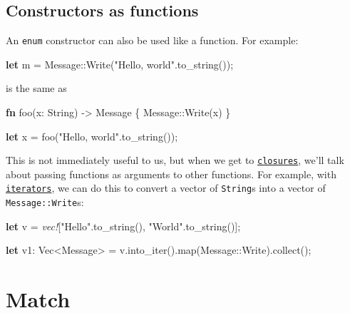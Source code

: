 \documentclass[a4paper,]{book}
\newenvironment{Shaded}{\begin{snugshade}}{\end{snugshade}}
\newcommand{\KeywordTok}[1]{\textcolor[rgb]{0.13,0.29,0.53}{\textbf{{#1}}}}
\newcommand{\DataTypeTok}[1]{\textcolor[rgb]{0.13,0.29,0.53}{{#1}}}
\newcommand{\StringTok}[1]{\textcolor[rgb]{0.31,0.60,0.02}{{#1}}}
\newcommand{\PreprocessorTok}[1]{\textcolor[rgb]{0.56,0.35,0.01}{\textit{{#1}}}}
\newcommand{\NormalTok}[1]{{#1}}
\begin{document}
\subsection{Constructors as functions}\label{constructors-as-functions}

An \texttt{enum} constructor can also be used like a function. For
example:

\begin{Shaded}
\begin{Highlighting}[]
\KeywordTok{let} \NormalTok{m = Message::Write(}\StringTok{"Hello, world"}\NormalTok{.to_string());}
\end{Highlighting}
\end{Shaded}

is the same as

\begin{Shaded}
\begin{Highlighting}[]
\KeywordTok{fn} \NormalTok{foo(x: }\DataTypeTok{String}\NormalTok{) -> Message \{}
    \NormalTok{Message::Write(x)}
\NormalTok{\}}

\KeywordTok{let} \NormalTok{x = foo(}\StringTok{"Hello, world"}\NormalTok{.to_string());}
\end{Highlighting}
\end{Shaded}

This is not immediately useful to us, but when we get to
\protect\hyperlink{sec--closures}{\texttt{closures}}, we'll talk about
passing functions as arguments to other functions. For example, with
\protect\hyperlink{sec--iterators}{\texttt{iterators}}, we can do this
to convert a vector of \texttt{String}s into a vector of
\texttt{Message::Write}s:

\begin{Shaded}
\begin{Highlighting}[]

\KeywordTok{let} \NormalTok{v = }\PreprocessorTok{vec!}\NormalTok{[}\StringTok{"Hello"}\NormalTok{.to_string(), }\StringTok{"World"}\NormalTok{.to_string()];}

\KeywordTok{let} \NormalTok{v1: }\DataTypeTok{Vec}\NormalTok{<Message> = v.into_iter().map(Message::Write).collect();}
\end{Highlighting}
\end{Shaded}

\hypertarget{sec--match}{\section{Match}\label{sec--match}}
\end{document}
